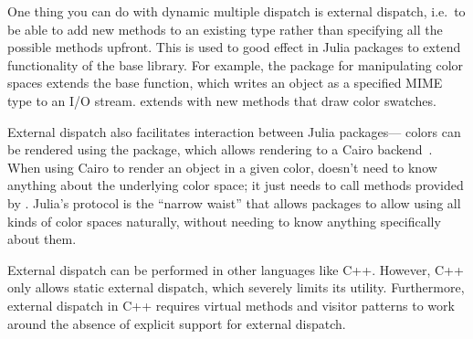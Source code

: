 One thing you can do with dynamic multiple dispatch is external dispatch,
i.e.\ to be able to add new methods to an existing type rather than
specifying all the possible methods upfront. This is used to good effect
in Julia packages to extend functionality of the base library. For example,
the package  for manipulating color spaces extends the
 base function, which writes an object as a specified
MIME type\cite{mimerfc} to an I/O stream.  extends
 with new methods that draw color swatches.


External dispatch also facilitates interaction between Julia packages--- 
colors can be rendered using the  package,
which allows rendering to a Cairo backend~\cite{cairographics}.
When using Cairo to render an object in a given color, 
doesn't need to know anything about the underlying color space; it just
needs to call  methods provided by .
Julia's  protocol is the ``narrow waist'' that allows
packages to allow using all kinds of color spaces naturally, without
needing to know anything specifically about them.

External dispatch can be performed in other languages like C++. However,
C++ only allows static external dispatch, which severely limits its utility.
Furthermore, external dispatch in C++ requires virtual methods and visitor
patterns\cite{designpatterns} to work around the absence of explicit support
for external dispatch.

